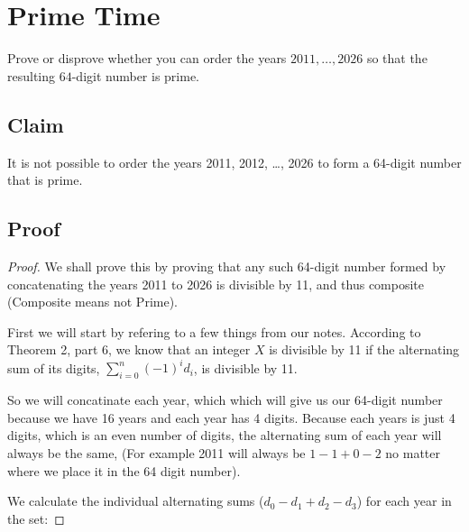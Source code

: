 \documentclass[answers]{exam}
\begin{document}
	\section{Prime Time}
		\begin{questions}	
			\question Prove or disprove whether you can order the years $2011, \dots, 2026$ so that the resulting $64$-digit number is prime.

			\begin{solution}
		\subsection*{Claim}
		It is not possible to order the years 2011, 2012, \dots, 2026 to form a 64-digit number that is prime. 

		\subsection*{Proof}
			\begin{proof}
		We shall prove this by proving that any such 64-digit number formed by concatenating the years 2011 to 2026 is divisible by 11, and thus composite (Composite means not Prime).

		First we will start by refering to a few things from our notes. According to Theorem 2, part 6, we know that an integer $X$ is divisible by 11 if the alternating sum of its digits, $\sum_{i=0}^{n}(-1)^{i}d_{i}$, is divisible by 11.

		So we will concatinate each year, which which will give us our 64-digit number because we have 16 years and each year has 4 digits. Because each years is just 4 digits, which is an even number of digits, the alternating sum of each year will always be the same, (For example 2011 will always be $1 - 1 + 0 - 2$ no matter where we place it in the 64 digit number). 


		We calculate the individual alternating sums ($d_0 - d_1 + d_2 - d_3$) for each year in the set:


\end{proof}
\end{solution}
\end{questions}
\end{document}
